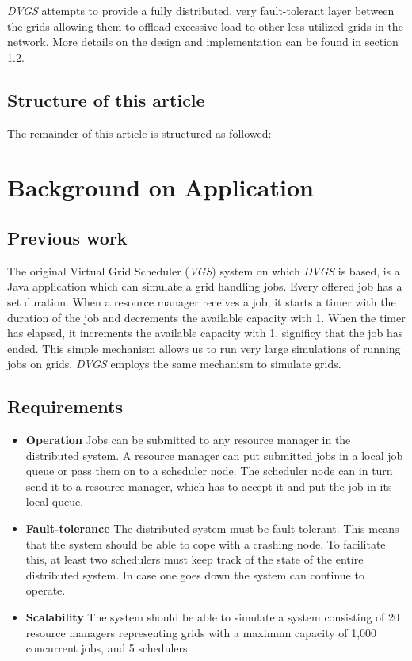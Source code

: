\documentclass{article}
\begin{document}
\textit{DVGS} attempts to provide a fully distributed, very fault-tolerant layer between the grids allowing them to offload excessive load to other less utilized grids in the network. More details on the design and implementation can be found in section \ref{}.

\subsection{Structure of this article}
The remainder of this article is structured as followed: 


\section{Background on Application}

\subsection{Previous work}
The original Virtual Grid Scheduler (\textit{VGS}) system on which \textit{DVGS} is based, is a Java application which can simulate a grid handling jobs. Every offered job has a set duration. When a resource manager receives a job, it starts a timer with the duration of the job and decrements the available capacity with 1. When the timer has elapsed, it increments the available capacity with 1, significy that the job has ended. This simple mechanism allows us to run very large simulations of running jobs on grids. \textit{DVGS} employs the same mechanism to simulate grids. 

\subsection{Requirements}

\begin{itemize}
\item \textbf{Operation} Jobs can be submitted to any resource manager in the distributed system. A resource manager can put submitted jobs in a local job queue or pass them on to a scheduler node. The scheduler node can in turn send it to a resource manager, which has to accept it and put the job in its local queue.
\item \textbf{Fault-tolerance} The distributed system must be fault tolerant. This means that the system should be able to cope with a crashing node. To facilitate this, at least two schedulers must keep track of the state of the entire distributed system. In case one goes down the system can continue to operate.
\item \textbf{Scalability} The system should be able to simulate a system consisting of 20 resource managers representing grids with a maximum capacity of 1,000 concurrent jobs, and 5 schedulers.
\end{itemize}
\end{document}
